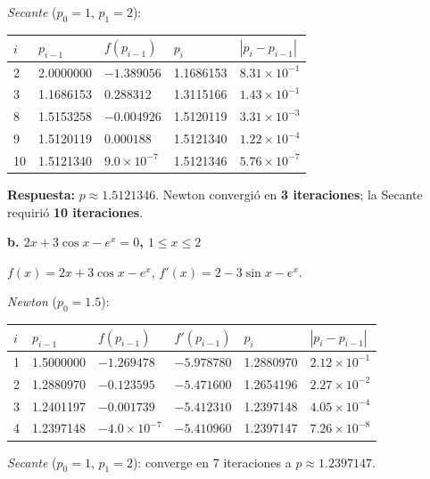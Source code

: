 \documentclass[12pt,a4paper]{article}
\begin{document}
\textit{Secante} ($p_0=1$, $p_1=2$):

\begin{center}\small
\begin{tabular}{C{0.5cm}C{2.5cm}C{2.2cm}C{2.5cm}C{1.8cm}}
\toprule
$i$ & $p_{i-1}$ & $f(p_{i-1})$ & $p_i$ & $|p_i-p_{i-1}|$ \\
 & 2.0000000 & $-1.389056$ & 1.1686153 & $8.31\times10^{-1}$ \\
3 & 1.1686153 & $0.288312$ & 1.3115166 & $1.43\times10^{-1}$ \\
8 & 1.5153258 & $-0.004926$ & 1.5120119 & $3.31\times10^{-3}$ \\
9 & 1.5120119 & $0.000188$ & 1.5121340 & $1.22\times10^{-4}$ \\
10 & 1.5121340 & $9.0\times10^{-7}$ & 1.5121346 & $5.76\times10^{-7}$ \\
\bottomrule
\end{tabular}
\end{center}

\textbf{Respuesta:} $p \approx \boxed{1.5121346}$. Newton convergi\'o en \textbf{3 iteraciones}; la Secante requiri\'o \textbf{10 iteraciones}.

\vspace{0.3cm}
\textbf{b. $2x + 3\cos x - e^x = 0$, \; $1 \leq x \leq 2$}

$f(x) = 2x + 3\cos x - e^x$, \quad $f'(x) = 2 - 3\sin x - e^x$.

\textit{Newton} ($p_0 = 1.5$):

\begin{center}\small
\begin{tabular}{C{0.5cm}C{2.5cm}C{2.5cm}C{2.5cm}C{2.5cm}C{1.8cm}}
\toprule
$i$ & $p_{i-1}$ & $f(p_{i-1})$ & $f'(p_{i-1})$ & $p_i$ & $|p_i-p_{i-1}|$ \\
 & 1.5000000 & $-1.269478$ & $-5.978780$ & 1.2880970 & $2.12\times10^{-1}$ \\
2 & 1.2880970 & $-0.123595$ & $-5.471600$ & 1.2654196 & $2.27\times10^{-2}$ \\
3 & 1.2401197 & $-0.001739$ & $-5.412310$ & 1.2397148 & $4.05\times10^{-4}$ \\
4 & 1.2397148 & $-4.0\times10^{-7}$ & $-5.410960$ & 1.2397147 & $7.26\times10^{-8}$ \\
\bottomrule
\end{tabular}
\end{center}

\textit{Secante} ($p_0=1$, $p_1=2$): converge en 7 iteraciones a $p \approx 1.2397147$.
\end{document}

